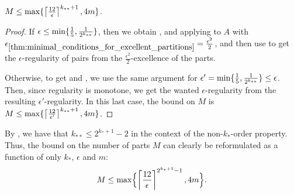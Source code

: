 \begin{theorem}
\begin{enumerate}[label={\Roman*}., ref={\Roman*}, font=\rmfamily]
                    $M \leq \max \{ \left\lceil \frac{12}{\epsilon} \right\rceil^{k_{**}+1}, 4m \}$.
            \end{enumerate}
            \begin{proof}
                If $\epsilon \leq \min \{ \frac{1}{5}, \frac{1}{2^{k_{**}}} \}$, then we obtain ,
                 and  applying
                 to $A$ with
                $\epsilon_{\ref{thm:minimal_conditions_for_excellent_partitions}} = \frac{\epsilon^2}{2}$, and then use
                 to get the $\epsilon$-regularity of pairs from the $\frac{\epsilon^2}{2}$-excellence
                of the parts.

                Otherwise, to get  and ,
                we use the same argument for $\epsilon' = \min \{ \frac{1}{5}, \frac{1}{2^{k_{**}}} \} \leq \epsilon$.
                Then, since regularity is monotone, we get the wanted $\epsilon$-regularity from the resulting $\epsilon'$-regularity.
                In this last case, the bound on $M$ is $M \leq \max \{ \left\lceil \frac{12}{\epsilon'} \right\rceil^{k_{**}+1}, 4m \}$.
            \end{proof}
        \end{theorem}

        \begin{remark}
            By , we have that $k_{**} \leq 2^{k_* + 1}-2$ in the context of the non-$k_*$-order
            property.
            Thus, the bound on the number of parts $M$ can clearly be reformulated as a function of only $k_*$, $\epsilon$ and $m$:
            \[
                M \leq \max \Bigl\{ \left\lceil \frac{12}{\epsilon} \right\rceil^{2^{k_* + 1}-1}, 4m \Bigr\}.
            \]
        \end{remark}




